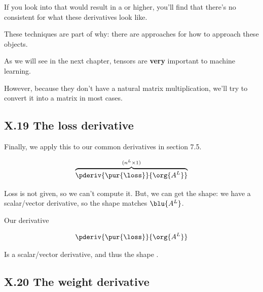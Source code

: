         \begin{clarification}
            If you look into  that would result in a  or higher, you'll find that there's no consistent  for what these derivatives look like.
            
            These techniques are part of why: there are  approaches for how to approach these objects.
        \end{clarification}
        
        As we will see in the next chapter, tensors are \textbf{very} important to machine learning. 
        
        However, because they don't have a natural matrix multiplication, we'll try to convert it into a matrix in most cases.
    
    \secdiv
        
    \subsection*{X.19 \quad The loss derivative}
    
        Finally, we apply this to our common derivatives in section 7.5.
        
        \begin{equation}
            \overbrace{
                \pderiv {\pur{\loss}}{\org{A^L}}
            }^{(n^{L} \times 1)}
        \end{equation}
        
        Loss is not given, so we can't compute it. But, we can get the shape: we have a scalar/vector derivative, so the shape matches $\blu{A^L}$.\\
        
        \begin{notation}
            Our derivative
            
            \begin{equation}
                \pderiv {\pur{\loss}}{\org{A^L}}
            \end{equation}
        
            Is a scalar/vector derivative, and thus the shape .
        \end{notation}
            
    \secdiv
            
    \subsection*{X.20 \quad The weight derivative}
        
